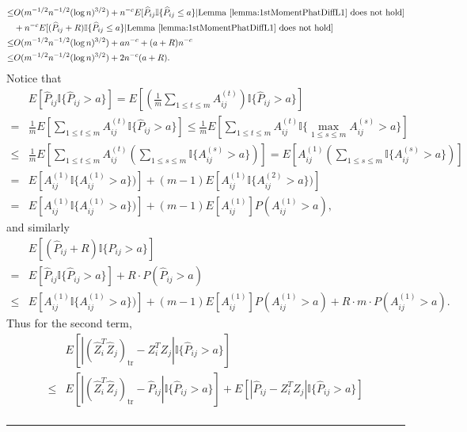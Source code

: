 \documentclass[a4paper]{article}
\newenvironment{proof}{{\bf Proof:  }}{\hfill\rule{2mm}{2mm}}
\renewcommand{\hat}{\widehat}
\begin{document}
\begin{proof}
\begin{align*}
	\le & O(m^{-1/2} n^{-1/2} (\log n)^{3/2}) + n^{-c} E[\hat{P}_{ij} \mathbb{I}\{\hat{P}_{ij} \le a\}| \mathrm{Lemma\ } \ref{lemma:1stMomentPhatDiffL1} \mathrm{\ does\ not\ hold}] \\
	& + n^{-c} E[(\hat{P}_{ij} + R) \mathbb{I}\{\hat{P}_{ij} \le a\}| \mathrm{Lemma\ } \ref{lemma:1stMomentPhatDiffL1} \mathrm{\ does\ not\ hold}] \\
	\le & O(m^{-1/2} n^{-1/2} (\log n)^{3/2}) + a n^{-c} + (a+R) n^{-c} \\
	\le & O(m^{-1/2} n^{-1/2} (\log n)^{3/2}) + 2 n^{-c} (a + R).
\end{align*}
Notice that
\begin{align*}
	& E[\hat{P}_{ij} \mathbb{I} \{ \hat{P}_{ij} > a \}]
	= E[\left(\frac{1}{m} \sum_{1 \le t \le m} A_{ij}^{(t)}\right) \mathbb{I} \{ \hat{P}_{ij} > a \}] \\
	= & \frac{1}{m} E[\sum_{1 \le t \le m} A_{ij}^{(t)} \mathbb{I} \{ \hat{P}_{ij} > a \}]
	\le \frac{1}{m} E[\sum_{1 \le t \le m} A_{ij}^{(t)} \mathbb{I} \{ \max_{1 \le s \le m} A_{ij}^{(s)} > a \}] \\
	\le & \frac{1}{m} E[\sum_{1 \le t \le m} A_{ij}^{(t)} \left(\sum_{1 \le s \le m}\mathbb{I} \{ A_{ij}^{(s)} > a \}\right)]
	= E[A_{ij}^{(1)} \left(\sum_{1 \le s \le m}\mathbb{I} \{ A_{ij}^{(s)} > a \}\right)] \\
	= & E[A_{ij}^{(1)} \mathbb{I} \{ A_{ij}^{(1)} > a \})] + (m-1) E[A_{ij}^{(1)} \mathbb{I} \{ A_{ij}^{(2)} > a \})] \\
	= & E[A_{ij}^{(1)} \mathbb{I} \{ A_{ij}^{(1)} > a \})] + (m-1) E[A_{ij}^{(1)}] P(A_{ij}^{(1)} > a),
\end{align*}
and similarly
\begin{align*}
	& E[(\hat{P}_{ij} + R) \mathbb{I} \{ \hat{P}_{ij} > a \}] \\
	= & E[\hat{P}_{ij} \mathbb{I} \{ \hat{P}_{ij} > a \}] + R \cdot P(\hat{P}_{ij} > a) \\
	\le & E[A_{ij}^{(1)} \mathbb{I} \{ A_{ij}^{(1)} > a \})] + (m-1) E[A_{ij}^{(1)}] P(A_{ij}^{(1)} > a)
	+ R \cdot m \cdot P(A_{ij}^{(1)} > a).
\end{align*}
Thus for the second term,
\begin{align*}
	& E[|(\hat{Z}_i^T \hat{Z}_j)_{\mathrm{tr}} - Z_i^T Z_j| \mathbb{I}\{\hat{P}_{ij} > a\}] \\
	\le & E[|(\hat{Z}_i^T \hat{Z}_j)_{\mathrm{tr}} - \hat{P}_{ij}| \mathbb{I}\{\hat{P}_{ij} > a\}] + E[|\hat{P}_{ij} - Z_i^T Z_j| \mathbb{I}\{\hat{P}_{ij} > a\}] \\

\end{align*}
\end{proof}
\end{document}
